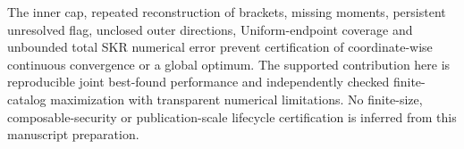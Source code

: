 The inner cap, repeated reconstruction of brackets, missing moments, persistent
unresolved flag, unclosed outer directions, Uniform-endpoint coverage and
unbounded total SKR numerical error prevent certification of coordinate-wise
continuous convergence or a global optimum. The supported contribution here
is reproducible joint best-found performance and independently checked
finite-catalog maximization with transparent numerical limitations. No
finite-size, composable-security or publication-scale lifecycle certification
is inferred from this manuscript preparation.
